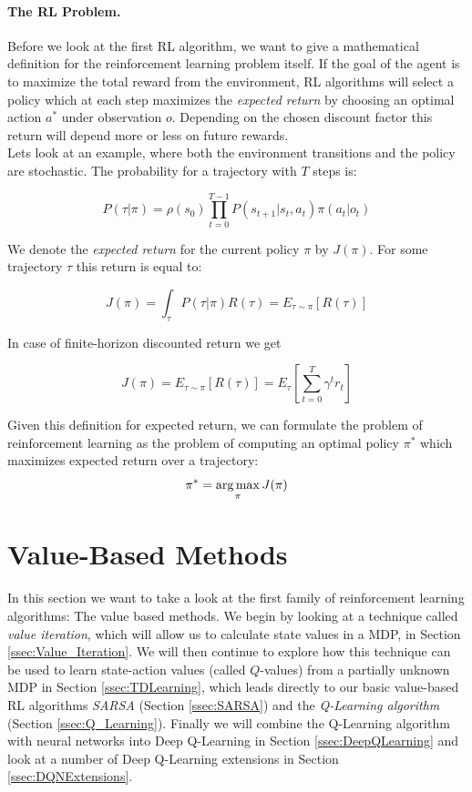 \paragraph{The RL Problem.}
Before we look at the first RL algorithm, we want to give a mathematical definition for the reinforcement learning problem itself. If the goal of the agent is to maximize the total reward from the environment, RL algorithms will select a policy which at each step maximizes the \textit{expected return} by choosing an optimal action $a^*$ under observation $o$. Depending on the chosen discount factor this return will depend more or less on future rewards. \\ 
Lets look at an example, where both the environment transitions and the policy are stochastic. The probability for a trajectory with $T$ steps is: 

\[P(\tau|\pi)=\rho(s_0)\prod_{t=0}^{T-1}P(s_{t+1}|s_t, a_t)\pi(a_t|o_t)\]

We denote the \textit{expected return} for the current policy $\pi$ by $J(\pi)$. For some trajectory $\tau$ this return is equal to:

\[J(\pi) = \int_\tau P(\tau|\pi)R(\tau) = E_{\tau\sim\pi}\left[R(\tau) \right]\]

In case of finite-horizon discounted return we get 

\[J(\pi) =  E_{\tau\sim\pi}\left[R(\tau) \right] = E_\tau\left[\sum_{t=0}^T \gamma^t r_t\right]\]

Given this definition for expected return, we can formulate the problem of reinforcement learning as the problem of computing an optimal policy $\pi^*$ which maximizes expected return over a trajectory:
\[\pi^*=\operatorname*{arg\,max}_\pi J(\pi)\]

\section{Value-Based Methods} \label{sec:ValueMethods}
In this section we want to take a look at the first family of reinforcement learning algorithms: The value based methods. We begin by looking at a technique called \textit{value iteration}, which will allow us to calculate state values in a MDP, in Section \ref{ssec:Value_Iteration}. We will then continue to explore how this technique can be used to learn state-action values (called $Q$-values) from a partially unknown MDP in Section \ref{ssec:TDLearning}, which leads directly to our basic value-based RL algorithms \textit{SARSA} (Section \ref{ssec:SARSA}) and the \textit{Q-Learning algorithm} (Section \ref{ssec:Q_Learning}). Finally we will combine the Q-Learning algorithm with neural networks into Deep Q-Learning in Section \ref{ssec:DeepQLearning} and look at a number of Deep Q-Learning extensions in Section \ref{ssec:DQNExtensions}. 

